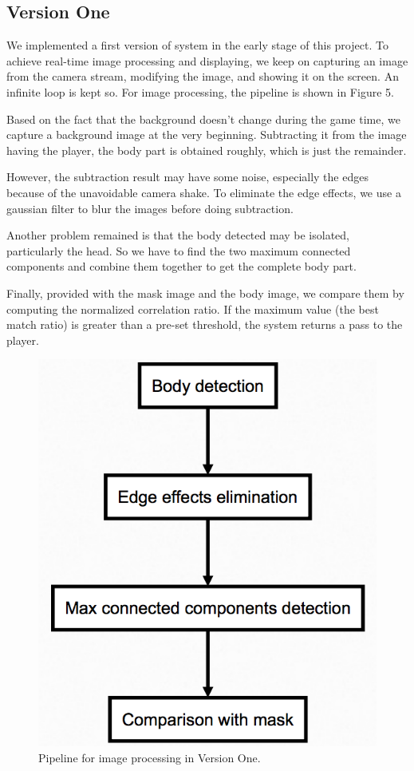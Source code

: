 \documentclass[11pt,twocolumn,letterpaper]{article}
\begin{document}
	\subsection{Version One}
        \par We implemented a first version of system in the early stage of this project. To achieve real-time image processing and displaying, we keep on capturing an image from the camera stream, modifying the image, and showing it on the screen. An infinite loop is kept so. For image processing, the pipeline is shown in Figure 5.
        \par Based on the fact that the background doesn't change during the game time, we capture a background image at the very beginning. Subtracting it from the image having the player, the body part is obtained roughly, which is just the remainder.
        \par However, the subtraction result may have some noise, especially the edges because of the unavoidable camera shake. To eliminate the edge effects, we use a gaussian filter to blur the images before doing subtraction.
        \par Another problem remained is that the body detected may be isolated, particularly the head. So we have to find the two maximum connected components and combine them together to get the complete body part.
        \par Finally, provided with the mask image and the body image, we compare them by computing the normalized correlation ratio. If the maximum value (the best match ratio) is greater than a pre-set threshold, the system returns a pass to the player.
        \begin{figure}[htbp]
			\centering
			\includegraphics[width=0.9\linewidth]{./Pic/flowchart.png}
			\caption{Pipeline for image processing in Version One.}
		\end{figure}
\end{document}
